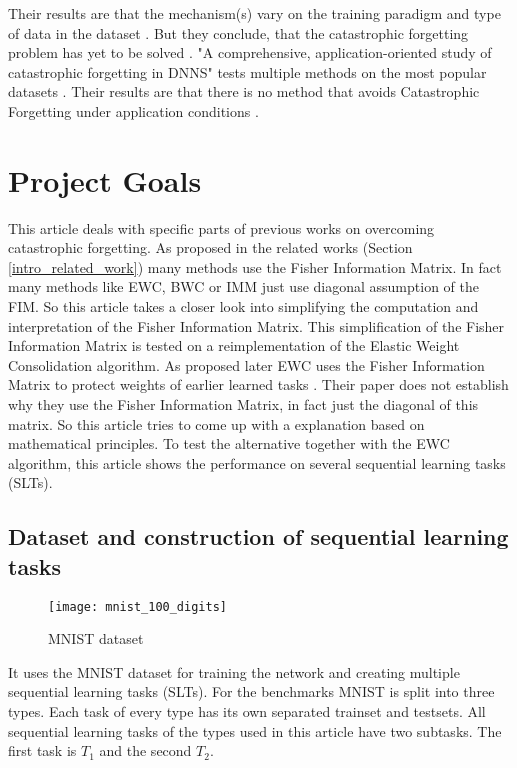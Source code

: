 Their results are that the mechanism(s) vary on the training paradigm and type of data in the dataset \cite{measuring_cf_in_nns}.
But they conclude, that the catastrophic forgetting problem has yet to be solved \cite{measuring_cf_in_nns}.
\newline
"A comprehensive, application-oriented study of catastrophic forgetting in DNNS" \cite{cf_application_oriented_study} tests multiple methods on the most popular datasets \cite{cf_application_oriented_study}.
Their results are that there is no method that avoids Catastrophic Forgetting under application conditions \cite{cf_application_oriented_study}.

\section{Project Goals}
\label{project_goals}

This article deals with specific parts of previous works on overcoming catastrophic forgetting.
As proposed in the related works (Section \ref{intro_related_work}) many methods use the Fisher Information Matrix.
In fact many methods like EWC, BWC or IMM just use diagonal assumption of the FIM.
So this article takes a closer look into simplifying the computation and interpretation of the Fisher Information Matrix.
This simplification of the Fisher Information Matrix is tested on a reimplementation of the Elastic Weight Consolidation algorithm.
As proposed later EWC uses the Fisher Information Matrix to protect weights of earlier learned tasks \cite{elastic-weight-consolidation}.
Their paper does not establish why they use the Fisher Information Matrix, in fact just the diagonal of this matrix.
So this article tries to come up with a explanation based on mathematical principles.
To test the alternative together with the EWC algorithm, this article shows the performance on several sequential learning tasks (SLTs).

\subsection*{Dataset and construction of sequential learning tasks}

\begin{figure}[H]
    \centering
    \texttt{[image: mnist\_100\_digits]}
    \caption{\cite{mnist_examples_image} MNIST dataset}
    \label{fig:intro_mnist_examples}
\end{figure}

It uses the MNIST dataset for training the network and creating multiple sequential learning tasks (SLTs).
For the benchmarks MNIST is split into three types.
Each task of every type has its own separated trainset and testsets.
All sequential learning tasks of the types used in this article have two subtasks.
The first task is $T_1$ and the second $T_2$.

